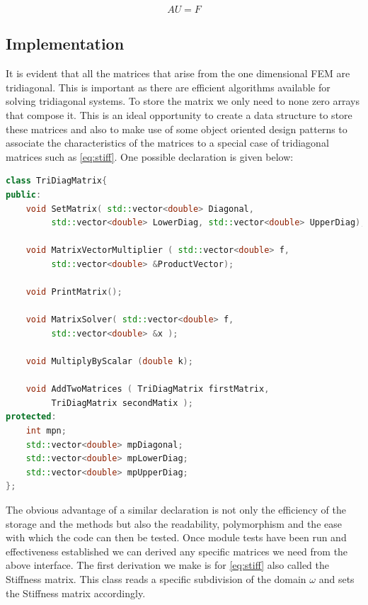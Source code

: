 \documentclass{uonmathreport}
\theoremstyle{definition}
\theoremstyle{problem}
\theoremstyle{theorem}
\begin{document}
\begin{equation}
AU = F			\label{eq:system1}
\end{equation}

\subsection{Implementation} \label{subsec:Implementation1}

It is evident that all the matrices that arise from the one dimensional FEM are tridiagonal. This is important as there are efficient algorithms available for solving tridiagonal systems. To store the matrix we only need to  none zero arrays that compose it. This is an ideal opportunity to create a data structure to store these matrices and also to make use of some object oriented design patterns to associate the characteristics of the matrices to a special case of tridiagonal matrices such as \ref{eq:stiff}. One possible declaration is given below:

\begin{lstlisting}[language=C++]
class TriDiagMatrix{
public:
    void SetMatrix( std::vector<double> Diagonal,
         std::vector<double> LowerDiag, std::vector<double> UpperDiag);

    void MatrixVectorMultiplier ( std::vector<double> f, 
    	 std::vector<double> &ProductVector);

    void PrintMatrix();

    void MatrixSolver( std::vector<double> f,
         std::vector<double> &x );

    void MultiplyByScalar (double k);

    void AddTwoMatrices ( TriDiagMatrix firstMatrix, 
    	 TriDiagMatrix secondMatix );
protected:
    int mpn;
    std::vector<double> mpDiagonal;
    std::vector<double> mpLowerDiag;
    std::vector<double> mpUpperDiag;
};
\end{lstlisting}



The obvious advantage of a similar declaration is not only the efficiency of the storage and the methods but also the readability, polymorphism and the ease with which the code can then be tested. Once module tests have been run and effectiveness established we can derived any specific matrices we need from the above interface. The first derivation we make is for \ref{eq:stiff} also called the Stiffness matrix. This class reads a specific subdivision of the domain $\omega$ and sets the Stiffness matrix accordingly.
\end{document}
